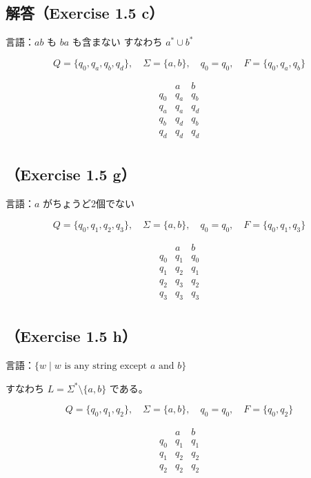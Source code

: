 \documentclass[uplatex,a4paper,11pt]{jsarticle}
\begin{document}
\subsection*{解答（Exercise 1.5 c）}

言語：$ab$ も $ba$ も含まない  
すなわち $a^* \cup b^*$

\[
Q=\{q_0,q_a,q_b,q_d\},\quad \Sigma=\{a,b\},\quad q_0=q_0,\quad F=\{q_0,q_a,q_b\}
\]

\[
\begin{array}{c|cc}
 & a & b \\
\hline
q_0 & q_a & q_b \\
q_a & q_a & q_d \\
q_b & q_d & q_b \\
q_d & q_d & q_d \\
\end{array}
\]

\subsection*{（Exercise 1.5 g）}

言語：$a$ がちょうど2個でない

\[
Q=\{q_0,q_1,q_2,q_3\},\quad \Sigma=\{a,b\},\quad q_0=q_0,\quad F=\{q_0,q_1,q_3\}
\]

\[
\begin{array}{c|cc}
 & a & b \\
\hline
q_0 & q_1 & q_0 \\
q_1 & q_2 & q_1 \\
q_2 & q_3 & q_2 \\
q_3 & q_3 & q_3 \\
\end{array}
\]

\subsection*{（Exercise 1.5 h）}

言語：$\{w \mid w \text{ is any string except } a \text{ and } b\}$

すなわち $L = \Sigma^* \setminus \{a,b\}$ である。

\[
Q=\{q_0,q_1,q_2\},\quad \Sigma=\{a,b\},\quad q_0=q_0,\quad F=\{q_0,q_2\}
\]

\[
\begin{array}{c|cc}
 & a & b \\
\hline
q_0 & q_1 & q_1 \\
q_1 & q_2 & q_2 \\
q_2 & q_2 & q_2 \\
\end{array}
\]
\end{document}
